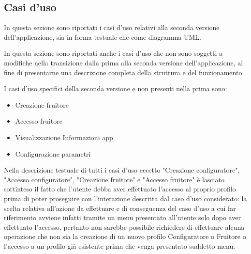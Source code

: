 \subsection{Casi d'uso}
In questa sezione sono riportati i casi d'uso relativi alla seconda versione dell'applicazione, sia in forma testuale che come diagramma UML.\bigskip 

In questa sezione sono riportati anche i casi d'uso che non sono soggetti a modifiche nella transizione dalla prima alla seconda versione dell'applicazione, al fine di presentarne una descrizione completa della struttura e del funzionamento.\bigskip

I casi d'uso specifici della seconda versione e non presenti nella prima sono:
\begin{itemize}
    \item Creazione fruitore
    \item Accesso fruitore
    \item Visualizzazione Informazioni app
    \item Configurazione parametri
\end{itemize} \bigskip

Nella descrizione testuale di tutti i casi d'uso eccetto "Creazione configuratore", "Accesso configuratore", "Creazione fruitore" e "Accesso fruitore" è lasciato sottinteso il fatto che l'utente debba aver effettuato l'accesso al proprio profilo prima di poter proseguire con l'interazione descritta dal caso d'uso considerato: la scelta relativa all'azione da effettuare e di conseguenza del caso d'uso a cui far riferimento avviene infatti tramite un menu presentato all'utente solo dopo aver effettuato l'accesso, pertanto non sarebbe possibile richiedere di effettuare alcuna operazione che non sia la creazione di un nuovo profilo Configuratore o Fruitore o l'accesso a un profilo già esistente prima che venga presentato suddetto menu.\bigskip



